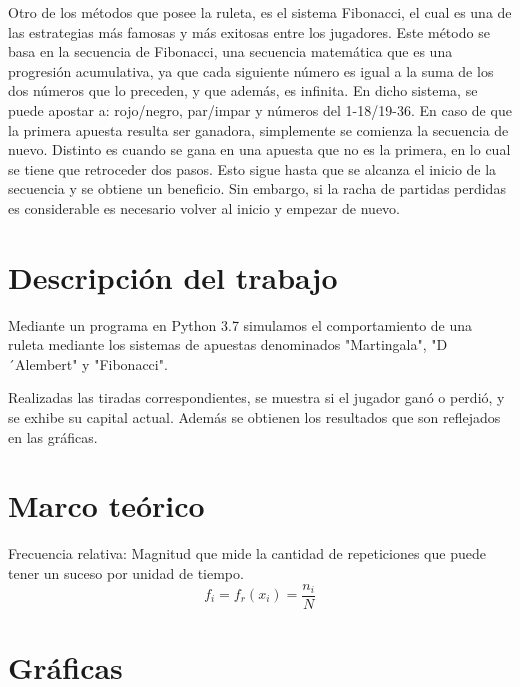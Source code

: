 \documentclass{article}
\begin{document}
    Otro de los métodos que posee la ruleta, es el sistema Fibonacci, el cual es una de las estrategias
    más famosas y más exitosas entre los jugadores. Este método se basa en la secuencia de Fibonacci,
    una secuencia matemática que es una progresión acumulativa,
    ya que cada siguiente número es igual a la suma de los dos números que lo preceden, y que además,
    es infinita. En dicho sistema, se puede apostar a: rojo/negro, par/impar y números del 1-18/19-36.
    En caso de que la primera apuesta resulta ser ganadora, simplemente se comienza la secuencia de nuevo.
    Distinto es cuando se gana en una apuesta que no es la primera, en lo cual se tiene que retroceder dos pasos.
    Esto sigue hasta que se alcanza el inicio de la secuencia y se obtiene un beneficio.
    Sin embargo, si la racha de partidas perdidas es considerable es necesario volver al inicio y
    empezar de nuevo.








    \section{Descripción del trabajo}
    \label{sec:headings}
    Mediante un programa en Python 3.7 simulamos el comportamiento de una ruleta mediante
    los sistemas de apuestas denominados "Martingala", "D´Alembert" y "Fibonacci".

    Realizadas las tiradas correspondientes, se muestra si el jugador ganó o perdió,
    y se exhibe su capital actual. Además se obtienen los resultados que son reflejados en las gráficas.

    \section{Marco teórico}

    Frecuencia relativa: Magnitud que mide la cantidad de repeticiones que puede tener un suceso por unidad de tiempo.
    \begin{equation}
        f_{i} = f_{r}(x_{i}) = \frac {n_{i}}{N}
    \end{equation}

    \section{Gráficas}
    
    \vspace{1cm}
\end{document}
